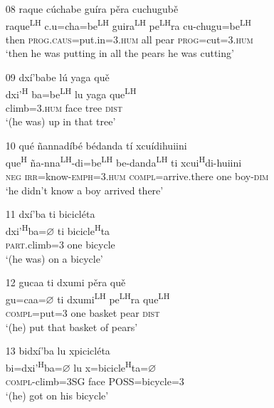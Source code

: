\begin{itemize}
\item[08]
\glll raque c\'{u}chabe gu\'{i}ra p\v{e}ra cuchugub\v{e}\\
raque\textsuperscript{LH} c.u=cha=be\textsuperscript{LH}  guira\textsuperscript{LH} pe\textsuperscript{LH}ra cu-chugu=be\textsuperscript{LH}\\
then \textsc{prog}.\textsc{caus}=put.in=\textsc{3.hum} all pear \textsc{prog}=cut=\textsc{3.hum}\\
\glt `then he was putting in all the pears he was cutting'


\item[09]
\glll dx\'{i}'babe l\'{u} yaga qu\v{e}\\
dxi'\textsuperscript{H} ba=be\textsuperscript{LH}  lu yaga que\textsuperscript{LH}\\
climb=\textsc{3.hum} face tree \textsc{dist}\\
\glt `(he was) up in that tree'


\item[10]
\glll qu\'{e} \~{n}annad\'{i}b\'{e} b\'{e}danda t\'{i} xcu\'{i}dihuiini\\
que\textsuperscript{H} \~{n}a-nna\textsuperscript{LH}-di=be\textsuperscript{LH}  be-danda\textsuperscript{LH} ti xcui\textsuperscript{H}di-huiini\\
\textsc{neg} \textsc{irr}=know-\textsc{emph}=\textsc{3.hum} \textsc{compl}=arrive.there one boy-\textsc{dim}\\
\glt `he didn't know a boy arrived there'
 

\item[11]
\glll dx\'{i}'ba ti bicicl\'{e}ta\\
dxi'\textsuperscript{H}ba={$\varnothing$} ti bicicle\textsuperscript{H}ta\\
\textsc{part}.climb=\textsc{3} one bicycle\\
\glt `(he was) on a bicycle'


\item[12]
\glll gucaa ti dxumi p\v{e}ra qu\v{e}\\
gu=caa={$\varnothing$} ti dxumi\textsuperscript{LH} pe\textsuperscript{LH}ra que\textsuperscript{LH}\\
\textsc{compl}=put=\textsc{3} one basket pear \textsc{dist}\\
\glt `(he) put that basket of pears'


\item[13]
\glll bidx\'{i}'ba lu xpicicl\'{e}ta\\
bi=dxi'\textsuperscript{H}ba={$\varnothing$} lu x=bicicle\textsuperscript{H}ta={$\varnothing$}\\
\textsc{compl}-climb=3SG face POSS=bicycle=\textsc{3}\\
\glt `(he) got on his bicycle'


\end{itemize}
